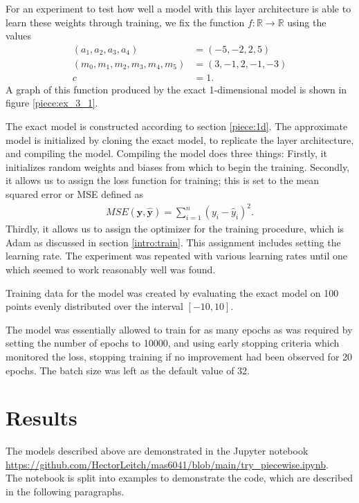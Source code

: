 \documentclass{somasmsc}
\begin{document}
For an experiment to test how well a model with this layer architecture is able to learn these weights through training, we fix the function $f : \mathbb{R} \rightarrow \mathbb{R}$ using the values
\begin{align*}
    \left(a_1, a_2, a_3, a_4\right) &= \left(-5, -2, 2, 5\right) \\
    \left(m_0, m_1, m_2, m_3, m_4, m_5\right) &= \left(3, -1, 2, -1, -3\right) \\
    c &= 1.
\end{align*}
 A graph of this function produced by the exact 1-dimensional model is shown in figure \ref{piece:ex_3_1}.

 The exact model is constructed according to section \ref{piece:1d}. The approximate model is initialized by cloning the exact model, to replicate the layer architecture, and compiling the model. Compiling the model does three things: Firstly, it initializes random weights and biases from which to begin the training. Secondly, it allows us to assign the loss function for training; this is set to the mean squared error or MSE defined as
 \begin{align*}
     MSE\left(\pmb{y}, \hat{\pmb{y}}\right) = \sum_{i=1}^n \left(y_i - \hat{y}_i\right)^2.
 \end{align*}
 Thirdly, it allows us to assign the optimizer for the training procedure, which is Adam as discussed in section \ref{intro:train}. This assignment includes setting the learning rate. The experiment was repeated with various learning rates until one which seemed to work reasonably well was found.

 Training data for the model was created by evaluating the exact model on 100 points evenly distributed over the interval $\left[-10, 10\right]$.

 The model was essentially allowed to train for as many epochs as was required by setting the number of epochs to 10000, and using early stopping criteria which monitored the loss, stopping training if no improvement had been observed for 20 epochs. The batch size was left as the default value of 32.

\section{Results}

The models described above are demonstrated in the Jupyter notebook \url{https://github.com/HectorLeitch/mas6041/blob/main/try_piecewise.ipynb}. \\ The notebook is split into examples to demonstrate the code, which are described in the following paragraphs.
\end{document}
